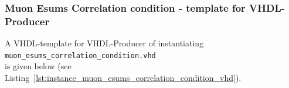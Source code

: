 \subsubsection{Muon Esums Correlation condition - template for VHDL-Producer}
A VHDL-template for VHDL-Producer of instantiating\\ \texttt{muon\_esums\_correlation\_condition.vhd}\\ is given below (see Listing~\ref{lst:instance_muon_esums_correlation_condition_vhd}).\\



